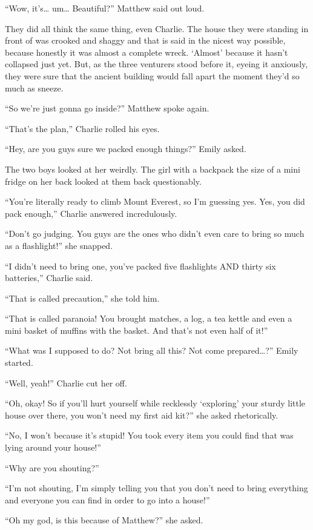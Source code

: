 “Wow, it's… um… Beautiful?” Matthew said out loud.

They did all think the same thing, even Charlie. The house they were standing in front of was crooked and shaggy and that is said in the nicest way possible, because honestly it was almost a complete wreck. ‘Almost' because it hasn't collapsed just yet. But, as the three venturers stood before it, eyeing it anxiously, they were sure that the ancient building would fall apart the moment they'd so much as sneeze.

“So we're just gonna go inside?” Matthew spoke again.

“That's the plan,” Charlie rolled his eyes.

“Hey, are you guys sure we packed enough things?” Emily asked.

The two boys looked at her weirdly. The girl with a backpack the size of a mini fridge on her back looked at them back questionably.

“You're literally ready to climb Mount Everest, so I'm guessing yes. Yes, you did pack enough,” Charlie answered incredulously.

“Don't go judging. You guys are the ones who didn't even care to bring so much as a flashlight!” she snapped.

“I didn't need to bring one, you've packed five flashlights AND thirty six batteries,” Charlie said.

“That is called precaution,” she told him.

“That is called paranoia! You brought matches, a log, a tea kettle and even a mini basket of muffins with the basket. And that's not even half of it!”

“What was I supposed to do? Not bring all this? Not come prepared…?” Emily started.

“Well, yeah!” Charlie cut her off.

“Oh, okay! So if you'll hurt yourself while recklessly ‘exploring' your sturdy little house over there, you won't need my first aid kit?” she asked rhetorically.

“No, I won't because it's stupid! You took every item you could find that was lying around your house!”

“Why are you shouting?”

“I'm not shouting, I'm simply telling you that you don't need to bring everything and everyone you can find in order to go into a house!”

“Oh my god, is this because of Matthew?” she asked.

